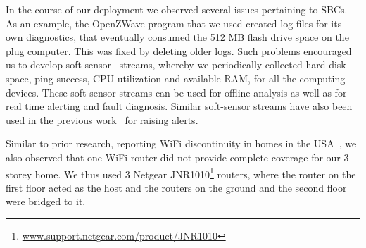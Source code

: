 \documentclass[10pt]{sensys-proc}
\newcommand{\figref}[1]{Figure~\ref{#1}}
\newcommand{\secref}[1]{Section~\ref{#1}}
\newcommand{\paradigm}{Sense-Local Store-Upload}
\begin{document}




In the course of our deployment we observed several issues pertaining to SBCs. As an example, the OpenZWave program that we used created log files for its own diagnostics, that eventually consumed the 512 MB flash drive space on the plug computer. This was fixed by deleting older logs. Such problems encouraged us to develop soft-sensor~\cite{softgreen} streams, whereby we periodically collected hard disk space, ping success, CPU utilization and available RAM, for all the computing devices. These soft-sensor streams can be used for offline analysis as well as for real time alerting and fault diagnosis. Similar soft-sensor streams have also been used in the previous work~\cite{hitchhiker_residential} for raising alerts.

Similar to prior research, reporting WiFi discontinuity in homes in the USA~\cite{hitchhiker_residential}, we also observed that one WiFi router did not provide complete coverage for our 3 storey home. We thus used 3 Netgear JNR1010\footnote{\url{www.support.netgear.com/product/JNR1010}} routers, where the router on the first floor acted as the host and the routers on the ground and the second floor were bridged to it. %
\end{document}
